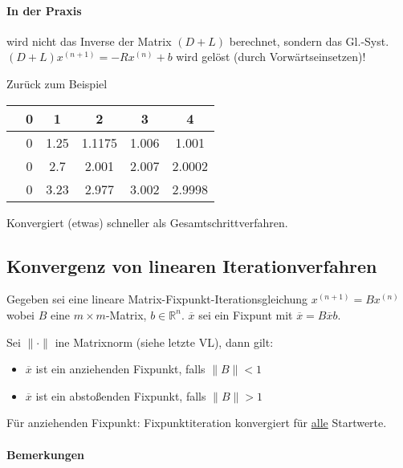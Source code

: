 \documentclass[a4paper,ngerman]{scrbook}
\newcommand{\R}{\ensuremath{\mathbb{R}}}%
\begin{document}
\paragraph{In der Praxis}

wird nicht das Inverse der Matrix $(D+L)$ berechnet, sondern das Gl.-Syst\@. $(D+L)x^{(n+1)} = -Rx^{(n)}+ b$ wird gelöst (durch Vorwärtseinsetzen)!

Zurück zum Beispiel

\begin{center}
  \begin{tabular}{c|c|c|c|c|c|}
    & 0 & 1 & 2 & 3 & 4\\\hline
    & 0 & 1.25 & 1.1175 & 1.006 & 1.001\\\hline
    & 0 & 2.7 & 2.001 & 2.007 & 2.0002\\\hline
    & 0 & 3.23 & 2.977 & 3.002 & 2.9998
  \end{tabular}
\end{center}
Konvergiert (etwas) schneller als Gesamtschrittverfahren.

\subsection{Konvergenz von linearen Iterationverfahren}

Gegeben sei eine lineare Matrix-Fixpunkt-Iterationsgleichung $x^{(n+1)} = Bx^{(n)}$ wobei $B$ eine $m \times m$-Matrix, $b \in \R^n$. $\overline{x}$ sei ein Fixpunt mit $\overline{x} = B\overline{x}  b$.

Sei $\|\cdot\|$ ine Matrixnorm (siehe letzte VL), dann gilt: \begin{itemize}
\item[] $\overline{x}$ ist ein anziehenden Fixpunkt, falls $\|B\| < 1$
\item[] $\overline{x}$ ist ein abstoßenden Fixpunkt, falls $\|B\| > 1$
\end{itemize}

Für anziehenden Fixpunkt: Fixpunktiteration konvergiert für \underline{alle} Startwerte.

\paragraph{Bemerkungen}
\end{document}
